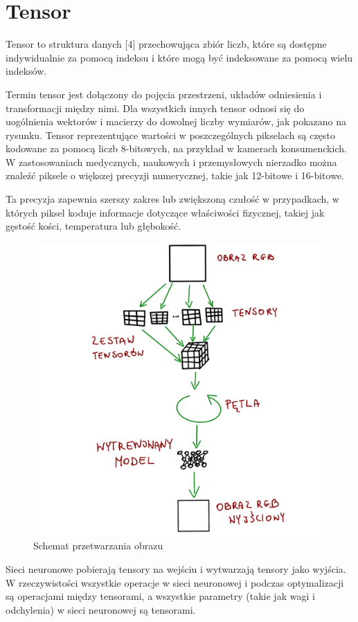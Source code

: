 \documentclass[brudnopis]{xmgr}
\begin{document}
\section{Tensor\label{s:dsssl}}


Tensor to struktura danych [4] przechowująca zbiór liczb, które są dostępne indywidualnie za pomocą indeksu i które mogą być indeksowane za pomocą wielu indeksów.

Termin tensor jest dołączony do pojęcia przestrzeni, układów odniesienia i transformacji między nimi. Dla wszystkich innych tensor odnosi się do uogólnienia wektorów i macierzy do dowolnej liczby wymiarów, jak pokazano na rysunku.
Tensor reprezentujące wartości w poszczególnych pikselach są często kodowane za pomocą liczb 8-bitowych, na przykład w kamerach konsumenckich. W zastosowaniach medycznych, naukowych i przemysłowych nierzadko można znaleźć piksele o większej precyzji numerycznej, takie jak 12-bitowe i 16-bitowe.

 Ta precyzja zapewnia szerszy zakres lub zwiększoną czułość w przypadkach, w których piksel koduje informacje dotyczące właściwości fizycznej, takiej jak gęstość kości, temperatura lub głębokość.
 
 \begin{figure}[!tbh]
\centering
\includegraphics[width=.8\hsize]{fig/5}
\caption{Schemat przetwarzania obrazu\label{RYS.5}}
\end{figure}

Sieci neuronowe pobierają tensory na wejściu i wytwarzają tensory jako wyjścia. W rzeczywistości wszystkie operacje w sieci neuronowej i podczas optymalizacji są operacjami między tensorami, a wszystkie parametry (takie jak wagi i odchylenia) w sieci neuronowej są tensorami.
\end{document}
